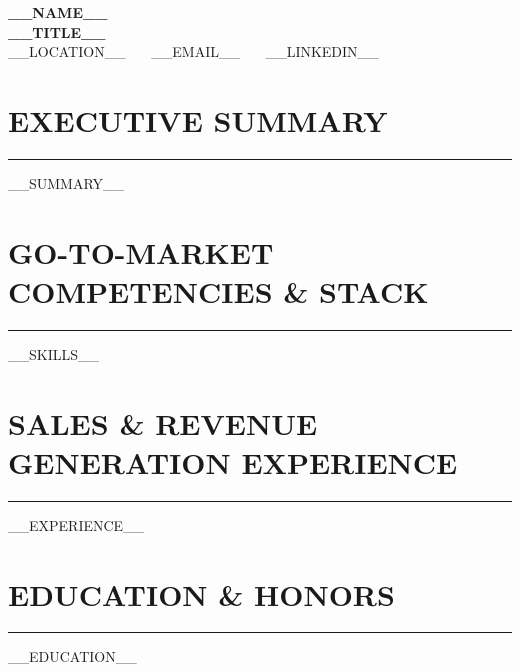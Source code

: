 \documentclass[10pt,letterpaper]{article}
\begin{document}
\begin{center}
    {\LARGE \textbf{\color{darkgray} __NAME__}} \\ \vspace{2pt}
    {\large \textbf{__TITLE__}} \\ \vspace{2pt}
    \small __LOCATION__ \ \textbar\ \ __EMAIL__ \ \textbar\ \ __LINKEDIN__
\end{center}

\vspace{-4pt}
\section*{\large\bfseries\color{primary}\uppercase{Executive Summary}}
\vspace{-4pt}\rule{\textwidth}{0.8pt}\vspace{3pt}
__SUMMARY__

\section*{\large\bfseries\color{primary}\uppercase{Go-To-Market Competencies \& Stack}}
\vspace{-4pt}\rule{\textwidth}{0.8pt}\vspace{3pt}
\small
__SKILLS__

\section*{\large\bfseries\color{primary}\uppercase{Sales \& Revenue Generation Experience}}
\vspace{-4pt}\rule{\textwidth}{0.8pt}\vspace{3pt}
\small
__EXPERIENCE__

\section*{\large\bfseries\color{primary}\uppercase{Education \& Honors}}
\vspace{-4pt}\rule{\textwidth}{0.8pt}\vspace{3pt}
\small
__EDUCATION__
\end{document}
